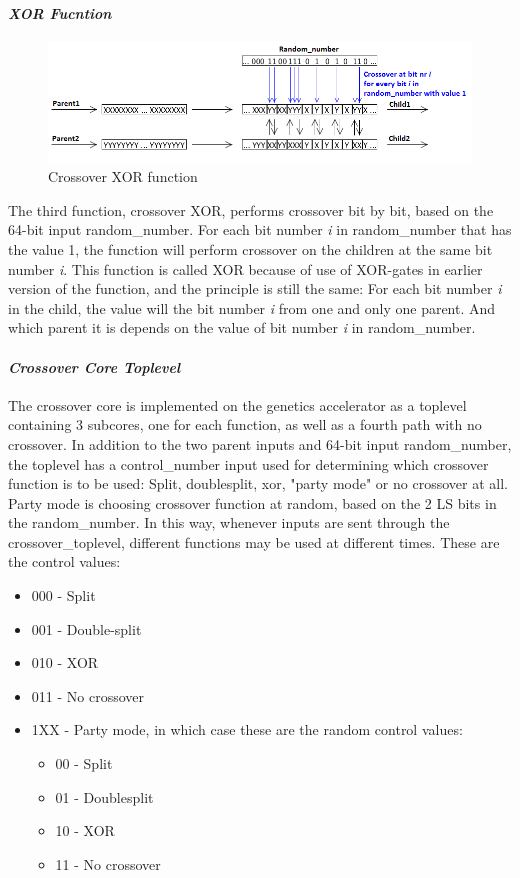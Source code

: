 \paragraph{\textit{XOR Fucntion}}
\begin{figure}[H]
\includegraphics[width=\textwidth]{fpga/fig/crossover_xor.png}
\caption{Crossover XOR function}
\label{fig_crossover_xor}
\end{figure}

The third function, crossover XOR, performs crossover bit by bit, based on the 64-bit input random\_number. For each bit number \emph{i} in random\_number that has the value 1, the function will perform crossover on the children at the same bit number \emph{i}. This function is called XOR because of use of XOR-gates in earlier version of the function, and the principle is still the same: For each bit number \emph{i} in the child, the value will the bit number \emph{i} from one and only one parent. And which parent it is depends on the value of bit number \emph{i} in random\_number.

\paragraph{\textit{Crossover Core Toplevel}}

The crossover core is implemented on the genetics accelerator as a toplevel containing 3 subcores, one for each function, as well as a fourth path with no crossover. In addition to the two parent inputs and 64-bit input random\_number, the toplevel has a control\_number input used for determining which crossover function is to be used: Split, doublesplit, xor, "party mode" or no crossover at all. Party mode is choosing crossover function at random, based on the 2 LS bits in the random\_number. In this way, whenever inputs are sent through the crossover\_toplevel, different functions may be used at different times. These are the control values:
\begin{itemize}
\item 000 - Split
\item 001 - Double-split
\item 010 - XOR
\item 011 - No crossover
\item 1XX - Party mode, in which case these are the random control values:
    \begin{itemize}
    \item 00 - Split
    \item 01 - Doublesplit
    \item 10 - XOR
    \item 11 - No crossover
    \end{itemize}
\end{itemize}
